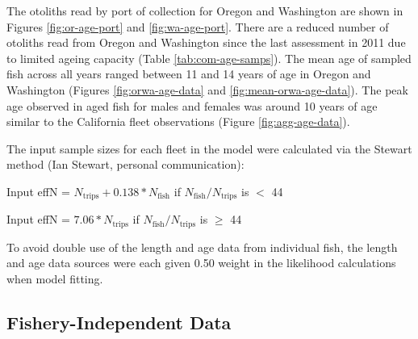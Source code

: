 \documentclass[11pt,
  english,
  a4paper,
]{article}
\begin{document}

The otoliths read by port of collection for Oregon and Washington are shown in Figures \ref{fig:or-age-port} and \ref{fig:wa-age-port}. There are a reduced number of otoliths read from Oregon and Washington since the last assessment in 2011 due to limited ageing capacity (Table \ref{tab:com-age-samps}). The mean age of sampled fish across all years ranged between 11 and 14 years of age in Oregon and Washington (Figures \ref{fig:orwa-age-data} and \ref{fig:mean-orwa-age-data}). The peak age observed in aged fish for males and females was around 10 years of age similar to the California fleet observations (Figure \ref{fig:agg-age-data}).

\leavevmode\tagmcend\tagstructend\par


The input sample sizes for each fleet in the model were calculated via the Stewart method (Ian Stewart, personal communication):

\leavevmode\tagmcend\tagstructend\par

\begin{centering}

Input effN = $N_{\text{trips}} + 0.138 * N_{\text{fish}}$ if $N_{\text{fish}}/N_{\text{trips}}$ is $<$ 44

Input effN = $7.06 * N_{\text{trips}}$ if $N_{\text{fish}}/N_{\text{trips}}$ is $\geq$ 44

\end{centering}


To avoid double use of the length and age data from individual fish, the length and age data sources were each given 0.50 weight in the likelihood calculations when model fitting.

\leavevmode\tagmcend\tagstructend\par


\hypertarget{fishery-independent-data}{%
\subsection{Fishery-Independent Data}\label{fishery-independent-data}}

\leavevmode\tagmcend\tagstructend
\end{document}

